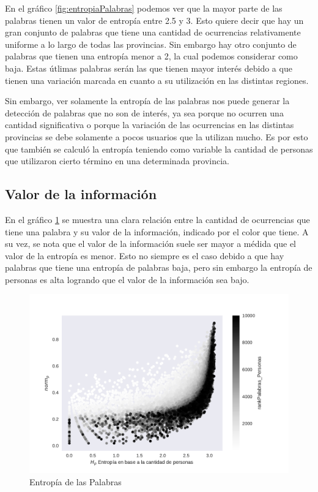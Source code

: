 En el gráfico \ref{fig:entropiaPalabras} podemos ver que la mayor parte de las palabras tienen un valor de entropía entre 2.5 y 3. Esto quiere decir que hay un gran conjunto de palabras que tiene una cantidad de ocurrencias relativamente uniforme a lo largo de todas las provincias. Sin embargo hay otro conjunto de palabras que tienen una entropía menor a 2, la cual podemos considerar como baja. Estas útlimas palabras serán las que tienen mayor interés debido a que tienen una variación marcada en cuanto a su utilización en las distintas regiones.

Sin embargo, ver solamente la entropía de las palabras nos puede generar la detección de palabras que no son de interés, ya sea porque no ocurren una cantidad significativa o porque la variación de las ocurrencias en las distintas provincias se debe solamente a pocos usuarios que la utilizan mucho. Es por esto que también se calculó la entropía teniendo como variable la cantidad de personas que utilizaron cierto término en una determinada provincia.

\subsection{Valor de la información}
\label{sub:ValorDeLaInformacion}
En el gráfico \ref{fig:infoValue} se muestra una clara relación entre la cantidad de ocurrencias que tiene una palabra y su valor de la información, indicado por el color que tiene. A su vez, se nota que el valor de la información suele ser mayor a médida que el valor de la entropía es menor. Esto no siempre es el caso debido a que hay palabras que tiene una entropía de palabras baja, pero sin embargo la entropía de personas es alta logrando que el valor de la información sea bajo.

\begin{figure}[ht]
\centering
\includegraphics[width=1.0\textwidth]{./images/entropiaPersonasxNormCantPersonas.pdf}
\caption{Entropía de las Palabras} 
\label{fig:infoValue} 
\end{figure}

